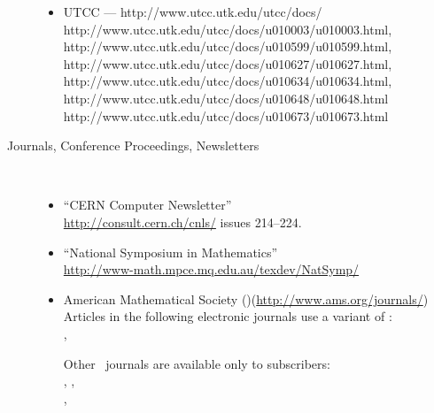 \begin{description}
\begin{itemize}
\item
UTCC --- %
{http://www.utcc.utk.edu/utcc/docs/}\\
%
{http://www.utcc.utk.edu/utcc/docs/u010003/u010003.html},
{http://www.utcc.utk.edu/utcc/docs/u010599/u010599.html},
{http://www.utcc.utk.edu/utcc/docs/u010627/u010627.html},
{http://www.utcc.utk.edu/utcc/docs/u010634/u010634.html},
{http://www.utcc.utk.edu/utcc/docs/u010648/u010648.html}\\
{http://www.utcc.utk.edu/utcc/docs/u010673/u010673.html}
\html{\smallskip}%


\end{itemize}


\htmlrule[50\% center]


\item [Journals, Conference Proceedings, Newsletters]~%
\begin{itemize}
%
\item ``CERN Computer Newsletter''\\
\url{http://consult.cern.ch/cnls/} issues 214--224.
\html{\smallskip}%

\item ``National Symposium in Mathematics''\\
\url{http://www-math.mpce.mq.edu.au/texdev/NatSymp/}
\html{\smallskip}

\item
American Mathematical Society (\AmS)\quad(\url{http://www.ams.org/journals/})\\
Articles in the following electronic journals use a variant of \latextohtml{}:\\
,
\\

\smallskip
Other \AmS\ journals are available only to subscribers:\\
,
,
\\
,


\end{itemize}
\end{description}
